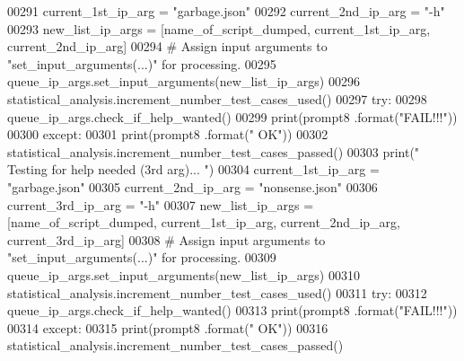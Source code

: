 \begin{DoxyCode}
00291         current\_1st\_ip\_arg = \textcolor{stringliteral}{"garbage.json"}
00292         current\_2nd\_ip\_arg = \textcolor{stringliteral}{"-h"}
00293         new\_list\_ip\_args = [name\_of\_script\_dumped, current\_1st\_ip\_arg, current\_2nd\_ip\_arg]
00294         \textcolor{comment}{#   Assign input arguments to "set\_input\_arguments(...)" for processing.}
00295         queue\_ip\_args.set\_input\_arguments(new\_list\_ip\_args)
00296         statistical\_analysis.increment\_number\_test\_cases\_used()
00297         \textcolor{keywordflow}{try}:
00298             queue\_ip\_args.check\_if\_help\_wanted()
00299             print(prompt8 .format(\textcolor{stringliteral}{"FAIL!!!"}))
00300         \textcolor{keywordflow}{except}:
00301             print(prompt8 .format(\textcolor{stringliteral}{" OK"}))
00302             statistical\_analysis.increment\_number\_test\_cases\_passed()
00303         print(\textcolor{stringliteral}{" Testing for help needed (3rd arg)... "})
00304         current\_1st\_ip\_arg = \textcolor{stringliteral}{"garbage.json"}
00305         current\_2nd\_ip\_arg = \textcolor{stringliteral}{"nonsense.json"}
00306         current\_3rd\_ip\_arg = \textcolor{stringliteral}{"-h"}
00307         new\_list\_ip\_args = [name\_of\_script\_dumped, current\_1st\_ip\_arg, current\_2nd\_ip\_arg, 
      current\_3rd\_ip\_arg]
00308         \textcolor{comment}{#   Assign input arguments to "set\_input\_arguments(...)" for processing.}
00309         queue\_ip\_args.set\_input\_arguments(new\_list\_ip\_args)
00310         statistical\_analysis.increment\_number\_test\_cases\_used()
00311         \textcolor{keywordflow}{try}:
00312             queue\_ip\_args.check\_if\_help\_wanted()
00313             print(prompt8 .format(\textcolor{stringliteral}{"FAIL!!!"}))
00314         \textcolor{keywordflow}{except}:
00315             print(prompt8 .format(\textcolor{stringliteral}{" OK"}))
00316             statistical\_analysis.increment\_number\_test\_cases\_passed()
\end{DoxyCode}
\hypertarget{classutilities_1_1queue__ip__arguments__tester_1_1queue__ip__args__tester_a49bd049dbf616cc1f604d3c0cbe84c43}{}
